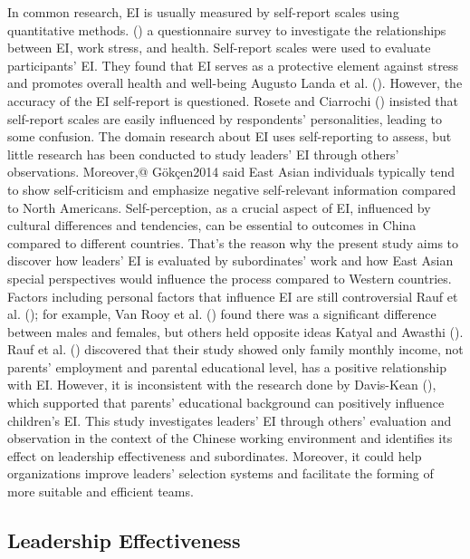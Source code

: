 \documentclass[
  man,
  longtable,
  nolmodern,
  notxfonts,
  notimes,
  colorlinks=true,linkcolor=blue,citecolor=blue,urlcolor=blue]{apa7}
\begin{document}
In common research, EI is usually measured by self-report scales using
quantitative methods.
() a
questionnaire survey to investigate the relationships between EI, work
stress, and health. Self-report scales were used to evaluate
participants' EI. They found that EI serves as a protective element
against stress and promotes overall health and well-being Augusto Landa
et al. (). However, the accuracy of
the EI self-report is questioned. Rosete and Ciarrochi
() insisted that self-report
scales are easily influenced by respondents' personalities, leading to
some confusion. The domain research about EI uses self-reporting to
assess, but little research has been conducted to study leaders' EI
through others' observations. Moreover,@ Gökçen2014 said East Asian
individuals typically tend to show self-criticism and emphasize negative
self-relevant information compared to North Americans. Self-perception,
as a crucial aspect of EI, influenced by cultural differences and
tendencies, can be essential to outcomes in China compared to different
countries. That's the reason why the present study aims to discover how
leaders' EI is evaluated by subordinates' work and how East Asian
special perspectives would influence the process compared to Western
countries. Factors including personal factors that influence EI are
still controversial Rauf et al. (); for
example, Van Rooy et al. () found there
was a significant difference between males and females, but others held
opposite ideas Katyal and Awasthi ().
Rauf et al. () discovered that their study
showed only family monthly income, not parents' employment and parental
educational level, has a positive relationship with EI. However, it is
inconsistent with the research done by Davis-Kean
(), which supported that parents'
educational background can positively influence children's EI. This
study investigates leaders' EI through others' evaluation and
observation in the context of the Chinese working environment and
identifies its effect on leadership effectiveness and subordinates.
Moreover, it could help organizations improve leaders' selection systems
and facilitate the forming of more suitable and efficient teams.

\subsection{Leadership Effectiveness}\label{leadership-effectiveness}
\end{document}
